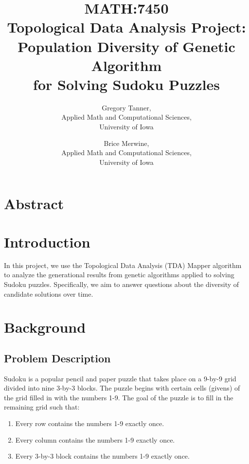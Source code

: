 \documentclass[english]{article}
\begin{document}
\title{MATH:7450\\
Topological Data Analysis Project: \\
Population Diversity of Genetic Algorithm\\
for Solving Sudoku Puzzles}

\author{Gregory Tanner,\\ 
Applied Math and Computational Sciences,\\
University of Iowa 
\and Brice Merwine,\\
Applied Math and Computational Sciences,\\
University of Iowa}
\maketitle

\section{Abstract}
\section{Introduction}
In this project, we use the Topological Data Analysis (TDA) Mapper algorithm to analyze the generational results from genetic algorithms applied to solving Sudoku puzzles.
Specifically, we aim to answer questions about the diversity of candidate solutions over time.
\section{Background}
\subsection{Problem Description}
Sudoku is a popular pencil and paper puzzle that takes place on a 9-by-9 grid divided into nine 3-by-3 blocks. The puzzle begins with certain cells (givens) of the grid filled in with the numbers 1-9. The goal of the puzzle is to fill in the remaining grid such that:
\begin{enumerate}
\item Every row contains the numbers 1-9 exactly once.
\item Every column contains the numbers 1-9 exactly once.
\item Every 3-by-3 block contains the numbers 1-9 exactly once.
\end{enumerate}
\begin{figure}
\centering
{}
\qquad
{}
\end{figure}
\end{document}
